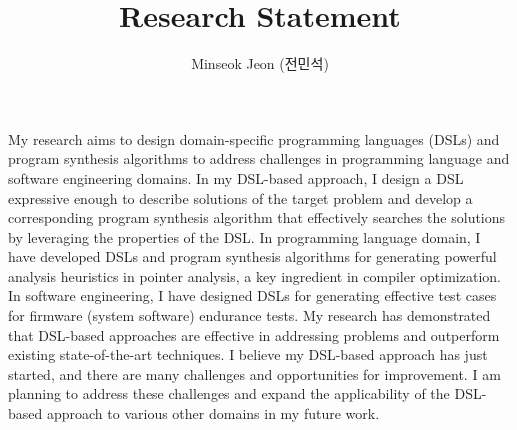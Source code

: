 \documentclass[11pt]{article}
\begin{document}
\title{Research Statement}

\author{Minseok Jeon (전민석)}



\newcommand{\DisjunctiveModel}{\textsc{Disjunctive Model}}
\newcommand{\FeatureLanguage}{\textsc{Feature Language}}
\newcommand{\GDL}{\textsc{Graph Description Language}}
\newcommand{\PLXGL}{\textsc{PL4XGL}}


\newcommand{\AbstractRelativeWritePattern}{\textsc{Abstract Relative Write Pattern}}

\maketitle 

My research aims to design domain-specific programming languages (DSLs) and program synthesis algorithms to address challenges in programming language and software engineering domains. 
%
In my DSL-based approach, I design a DSL expressive enough to describe solutions of the target problem and develop a corresponding program synthesis algorithm that effectively searches the solutions by leveraging the properties of the DSL.
%
In programming language domain, I have developed DSLs and program synthesis algorithms for generating powerful analysis heuristics in pointer analysis, a key ingredient in compiler optimization.
%
In software engineering, I have designed DSLs for generating effective test cases for firmware (system software) endurance tests.
%
My research has demonstrated that DSL-based approaches are effective in addressing problems and outperform existing state-of-the-art techniques.
%
I believe my DSL-based approach has just started, and there are many challenges and opportunities for improvement. 
%
I am planning to address these challenges and expand the applicability of the DSL-based approach to various other domains in my future work.
%
%
\end{document}
